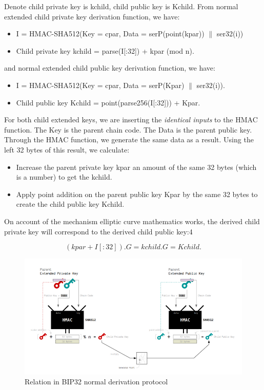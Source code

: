 Denote child private key is kchild, child public key is Kchild. From normal extended child private key derivation function, we have:

\begin{itemize}
    \item I = HMAC-SHA512(Key = cpar, Data = serP(point(kpar)) $\parallel$ ser32(i))
    \item Child private key kchild = parse(I[:32]) +  kpar (mod n).
\end{itemize}

and normal extended child public key derivation function, we have:
\begin{itemize}
    \item I = HMAC-SHA512(Key = cpar, Data = serP(Kpar) $\parallel$ ser32(i)).
    \item Child public key Kchild = point(parse256(I[:32])) + Kpar.
\end{itemize}

For both child extended keys, we are inserting the \textit{identical inputs} to the HMAC function. The Key is the parent chain code. The Data is the parent public key. Through the HMAC function, we generate the same data as a result. Using the left 32 bytes of this result, we calculate: 
\begin{itemize}
    \item Increase the parent private key kpar an amount of the same 32 bytes (which is a number) to get the kchild.

    \item Apply point addition on the parent public key Kpar by the same 32 bytes to create the child public key Kchild.
\end{itemize}

On account of the mechanism elliptic curve mathematics works, the derived child private key will correspond to the derived child public key:4

\begin{equation}
    (kpar + I[:32]) . G  =  kchild . G =  Kchild.
\end{equation}

\bigskip
\begin{figure}[ht!]
    \centering
    \includegraphics[width=1\textwidth]{images/relation_bip32.png}
    \caption[Relation in BIP32 normal derivation protocol]{Relation in BIP32 normal derivation protocol}
    \label{fig:4}
\end{figure}

